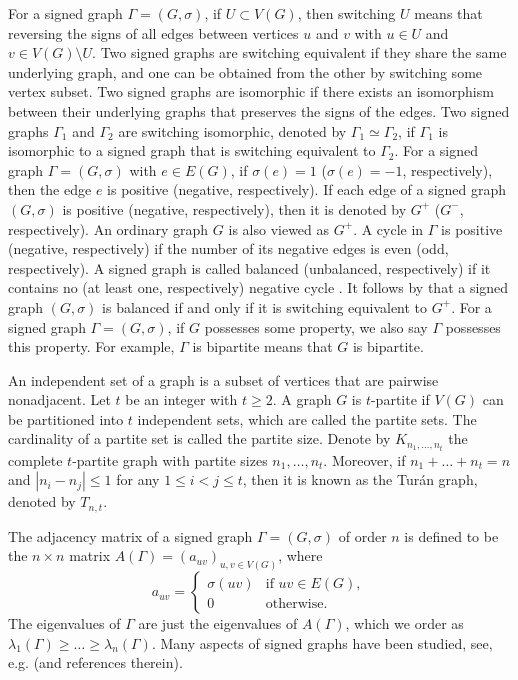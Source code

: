 \documentclass[10pt,a4paper]{amsart}
\numberwithin{equation}{section}
\begin{document}
For a signed graph $\Gamma=(G,\sigma)$, if $U\subset V(G)$, then switching  $U$ means that reversing the signs of all edges between vertices $u$ and $v$ with  $u\in U$ and $v\in V(G)\setminus U$. 
Two signed graphs  are switching equivalent if they share the same underlying graph, and one can be obtained from the other by switching  some vertex subset. 
Two signed graphs are isomorphic if there exists an isomorphism between their underlying graphs that preserves the signs of the edges. 
Two signed graphs $\Gamma_1$ and $\Gamma_2$  are switching isomorphic, denoted by $\Gamma_1 \simeq \Gamma_2$, if  $\Gamma_1$ is isomorphic to a signed graph that is switching equivalent to $\Gamma_2$. 
For a signed graph $\Gamma=(G, \sigma)$ with $e\in E(G)$, if $\sigma(e)=1$ ($\sigma(e)=-1$, respectively), then the edge $e$ is positive (negative, respectively). If each edge of a signed graph $(G,\sigma)$ is positive (negative, respectively), then it is denoted by $G^+$ ($G^-$, respectively). An ordinary graph $G$ is also viewed as $G^+$. A cycle in $\Gamma$ is positive (negative, respectively) if the number of its negative edges is even (odd, respectively).
A signed graph is called balanced (unbalanced, respectively) if it contains no (at least one, respectively) negative cycle \cite{Ha,HK,Z2}.
It follows by \cite[Lemma 5.3]{Z2} that a signed graph $(G,\sigma)$ is balanced if and
only if it is switching equivalent to $G^+$. For a signed graph $\Gamma=(G,\sigma)$, if $G$ possesses some property, we also say $\Gamma$ possesses this property. For example, $\Gamma$ is bipartite means that $G$ is bipartite.


An independent set of a graph is a subset of vertices that are pairwise nonadjacent.
Let $t$ be an integer with $t\ge2$. A graph $G$ is $t$-partite if $V(G)$ can be partitioned into $t$ independent sets,  which are called the partite sets. The cardinality of a partite set is called the partite size. 
Denote by $K_{n_1,\dots,n_t}$ the complete $t$-partite graph with partite sizes  $n_1,\dots,n_t$. Moreover, if $n_1+\dots+n_t=n$ and $|n_i-n_j|\le1$ for any $1\le i< j\le t$, then it is known as the Tur\'{a}n graph, denoted by $T_{n,t}$. 



The adjacency matrix  of a signed graph $\Gamma=(G, \sigma)$ of order $n$ is defined to be the $n\times n$ matrix $A(\Gamma)=(a_{uv})_{u,v\in V(G)}$, where
\[
a_{uv}=\begin{cases} \sigma(uv) & \mbox{if $uv\in E(G)$},\\
0 & \mbox{otherwise}.
\end{cases}
\]
The eigenvalues of $\Gamma$ are just the eigenvalues of $A(\Gamma)$, which we order as  $\lambda_1(\Gamma)\ge \dots\ge\lambda_n(\Gamma)$. Many aspects of signed graphs have been studied, see, e.g. \cite{AL,StanB} (and references therein).
\end{document}
